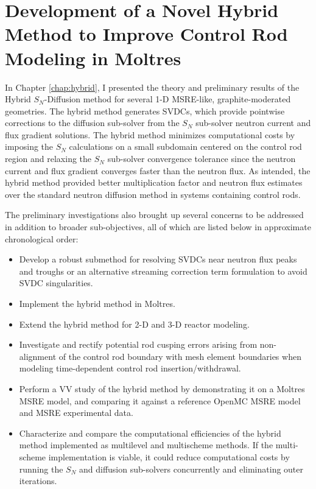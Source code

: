 \section{Development of a Novel Hybrid Method to Improve Control Rod Modeling in Moltres}

In Chapter \ref{chap:hybrid}, I presented the theory and preliminary results of the Hybrid
$S_N$-Diffusion method for several 1-D \gls{MSRE}-like, graphite-moderated geometries. The hybrid
method generates \glspl{SVDC}, which provide pointwise corrections to the diffusion sub-solver from
the $S_N$ sub-solver neutron current and flux gradient solutions. The hybrid method minimizes
computational costs by imposing the $S_N$ calculations on a small subdomain centered on the control
rod region and relaxing the $S_N$ sub-solver convergence tolerance since the neutron current and
flux gradient converges faster than the neutron flux. As intended,
the hybrid method provided better multiplication factor and neutron flux estimates over the
standard neutron diffusion method in systems containing control rods.

The preliminary investigations also brought up several concerns to be addressed in addition to
broader sub-objectives, all of which are listed below in approximate chronological order:
%
\begin{itemize}
  \item Develop a robust submethod for resolving \glspl{SVDC} near neutron flux peaks and troughs
    or an alternative streaming correction term formulation to avoid \gls{SVDC} singularities.
  \item Implement the hybrid method in Moltres.
  \item Extend the hybrid method for 2-D and 3-D reactor modeling.
  \item Investigate and rectify potential rod cusping errors arising from non-alignment of
    the control rod boundary with mesh element boundaries when modeling time-dependent control rod
    insertion/withdrawal.
  \item Perform a \gls{VV} study of the hybrid method by demonstrating it on a Moltres
    \gls{MSRE} model, and comparing it against a reference OpenMC \gls{MSRE} model and \gls{MSRE}
    experimental data.
  \item Characterize and compare the computational efficiencies of the hybrid method implemented as
    multilevel and multischeme methods. If the multi-scheme implementation is viable, it could
    reduce computational costs by running the $S_N$ and diffusion sub-solvers concurrently and
    eliminating outer iterations.
\end{itemize}

